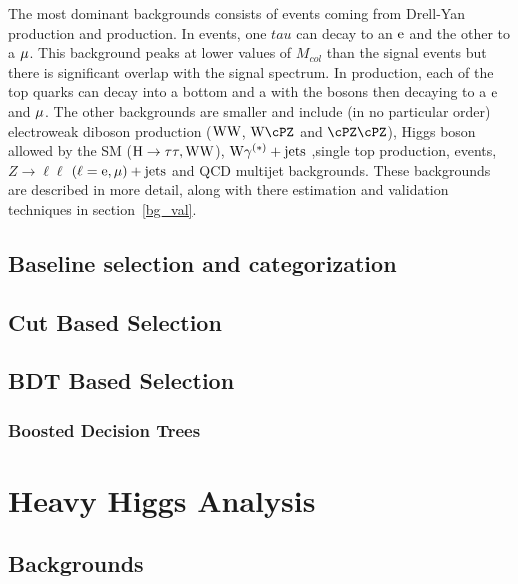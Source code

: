 The most dominant backgrounds consists of \ztt events coming from Drell-Yan production and \ttb production. In \ztt events, one $tau$ can decay to an $\text{e}$ and the other to a $\mu$. This background peaks at lower values of $M_{col}$ than the signal events but there is significant overlap with the signal spectrum. In \ttb production, each of the top quarks can decay into a bottom and a \PW with the \PW bosons then decaying to a $\text{e}$ and $\mu$. The other backgrounds are smaller and include (in no particular order) electroweak diboson production ($\text{W}\text{W}$, $\PW\cPZ$ and $\cPZ\cPZ$), Higgs boson allowed by the SM ($\text{H} \to \tau\tau,\text{W}\text{W}$), $\text{W}\gamma^{(*)}+\text{jets}$ ,single top production, \wjets events, $Z\to\ell\ell$ $(\ell = \text{e}, \mu)+\text{jets}$ and QCD multijet backgrounds. These backgrounds are described in more detail, along with there estimation and validation techniques in section~\ref{bg_val}.        


\subsection{Baseline selection and categorization}
\label{h125_evt_sel_bkg}

\subsection{Cut Based Selection}
\label{h125_cb_sel}

\subsection{BDT Based Selection}
\label{h125_bdt_Sel}

\subsubsection{Boosted Decision Trees}
\label{bdts}


\section{Heavy Higgs Analysis}
\label{hh_evt_selec}

\subsection{Backgrounds}
\label{hh_evt_sel_bkg}









%
% 
% 
